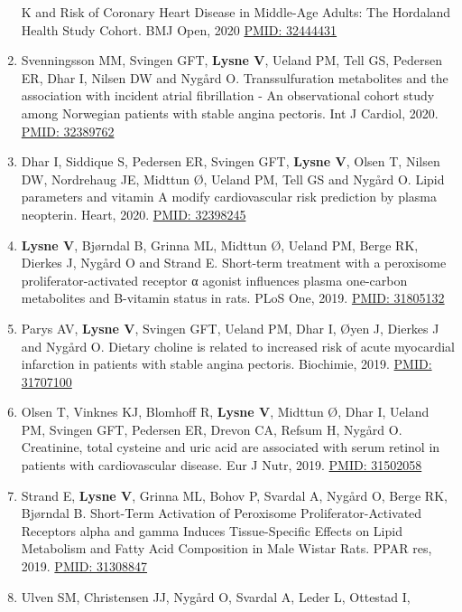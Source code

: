 \documentclass[11pt, a4paper]{awesome-cv}
\begin{document}
\begin{enumerate}
  K and Risk of Coronary Heart Disease in Middle-Age Adults: The
  Hordaland Health Study Cohort. BMJ Open, 2020
  \href{https://pubmed.ncbi.nlm.nih.gov/32444431}{PMID: 32444431}
\item
  Svenningsson MM, Svingen GFT, \textbf{Lysne V}, Ueland PM, Tell GS,
  Pedersen ER, Dhar I, Nilsen DW and Nygård O. Transsulfuration
  metabolites and the association with incident atrial fibrillation - An
  observational cohort study among Norwegian patients with stable angina
  pectoris. Int J Cardiol, 2020.
  \href{https://www.ncbi.nlm.nih.gov/pubmed/32389762}{PMID: 32389762}
\item
  Dhar I, Siddique S, Pedersen ER, Svingen GFT, \textbf{Lysne V}, Olsen
  T, Nilsen DW, Nordrehaug JE, Midttun Ø, Ueland PM, Tell GS and Nygård
  O. Lipid parameters and vitamin A modify cardiovascular risk
  prediction by plasma neopterin. Heart, 2020.
  \href{https://pubmed.ncbi.nlm.nih.gov/32398245/}{PMID: 32398245}
\item
  \textbf{Lysne V}, Bjørndal B, Grinna ML, Midttun Ø, Ueland PM, Berge
  RK, Dierkes J, Nygård O and Strand E. Short-term treatment with a
  peroxisome proliferator-activated receptor α agonist influences plasma
  one-carbon metabolites and B-vitamin status in rats. PLoS One, 2019.
  \href{https://www.ncbi.nlm.nih.gov/pubmed/31805132}{PMID: 31805132}
\item
  Parys AV, \textbf{Lysne V}, Svingen GFT, Ueland PM, Dhar I, Øyen J,
  Dierkes J and Nygård O. Dietary choline is related to increased risk
  of acute myocardial infarction in patients with stable angina
  pectoris. Biochimie, 2019.
  \href{https://www.ncbi.nlm.nih.gov/pubmed/31707100}{PMID: 31707100}
\item
  Olsen T, Vinknes KJ, Blomhoff R, \textbf{Lysne V}, Midttun Ø, Dhar I,
  Ueland PM, Svingen GFT, Pedersen ER, Drevon CA, Refsum H, Nygård O.
  Creatinine, total cysteine and uric acid are associated with serum
  retinol in patients with cardiovascular disease. Eur J Nutr, 2019.
  \href{https://www.ncbi.nlm.nih.gov/pubmed/31502058}{PMID: 31502058}
\item
  Strand E, \textbf{Lysne V}, Grinna ML, Bohov P, Svardal A, Nygård O,
  Berge RK, Bjørndal B. Short-Term Activation of Peroxisome
  Proliferator-Activated Receptors alpha and gamma Induces
  Tissue-Specific Effects on Lipid Metabolism and Fatty Acid Composition
  in Male Wistar Rats. PPAR res, 2019.
  \href{https://www.ncbi.nlm.nih.gov/pubmed/31308847}{PMID: 31308847}
\item
  Ulven SM, Christensen JJ, Nygård O, Svardal A, Leder L, Ottestad I,

\end{enumerate}
\end{document}
